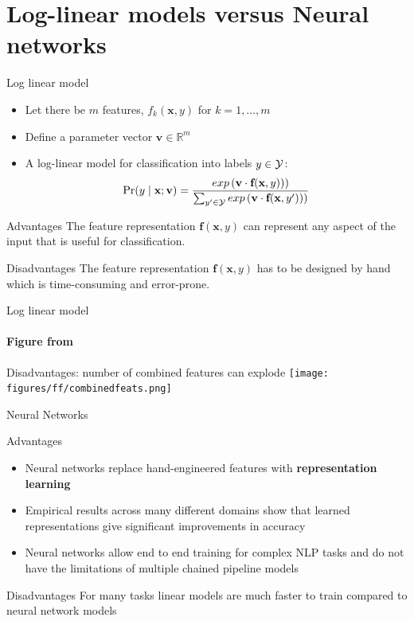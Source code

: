 




\section{Log-linear models versus Neural networks}
\frame{\tableofcontents[currentsection]}

\begin{frame}{Log linear model}
\begin{itemize}[<+->]
\item Let there be $m$ features, $f_k(\textbf{x}, y)$ for $k = 1, \ldots, m$
\item Define a parameter vector $\textbf{v} \in \mathbb{R}^m$
\item A log-linear model for classification into labels $y \in {\cal Y}$: 
\[ \Pr(y \mid \textbf{x}; \textbf{v}) = \frac{exp\left(\textbf{v} \cdot \textbf{f}(\textbf{x}, y))\right)}{\sum_{y' \in {\cal Y}} exp\left(\textbf{v} \cdot \textbf{f}(\textbf{x}, y'))\right)} \]
\end{itemize}
\pause
\begin{block}{Advantages}
The feature representation $\textbf{f}(\textbf{x}, y)$ can represent any aspect of the input that is useful for classification.
\end{block}
\pause
\begin{block}{Disadvantages}
The feature representation $\textbf{f}(\textbf{x}, y)$ has to be designed by hand which is time-consuming and error-prone.
\end{block}
\end{frame}

\begin{frame}{Log linear model}
\framesubtitle{Figure from \cite{Neubig2018}}
\begin{block}{Disadvantages: number of combined features can explode}
\texttt{[image: figures/ff/combinedfeats.png]}
\end{block}
\end{frame}

\begin{frame}{Neural Networks}
\begin{block}{Advantages}
\begin{itemize}[<+->]
\item Neural networks replace hand-engineered features with \textbf{representation learning}
\item Empirical results across many different domains show that learned representations give significant improvements in accuracy
\item Neural networks allow end to end training for complex NLP tasks and do not have the limitations of multiple chained pipeline models 
\end{itemize}
\end{block}
\pause
\begin{block}{Disadvantages}
For many tasks linear models are much faster to train compared to neural network models
\end{block}
\end{frame}

